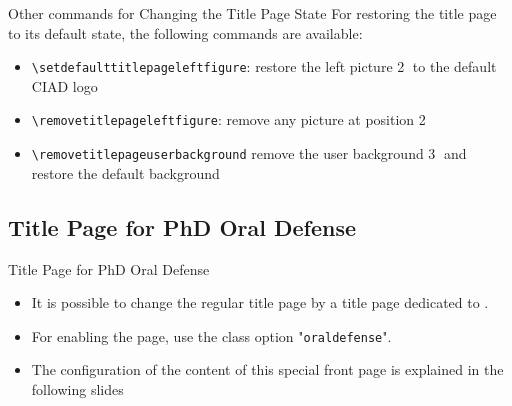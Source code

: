 \documentclass[english,sectioncirclenumberstyle]{ciadbeamer}
\begin{document}
\begin{frame}{{Other commands} for Changing the Title Page State}
	For restoring the title page to its default state, the following commands are available: \\[.25cm]
	\begin{itemize}
		\item \texttt{{\textbackslash}setdefaulttitlepageleftfigure}: restore the left picture \textcircled{2} to the default CIAD logo
		\item \texttt{{\textbackslash}removetitlepageleftfigure}: remove any picture at position \textcircled{2}
		\item \texttt{{\textbackslash}removetitlepageuserbackground} remove the user background \textcircled{3} and restore the default background
	\end{itemize}
\end{frame}

\subsection{Title Page for PhD Oral Defense}

\begin{frame}{{Title Page} for PhD Oral Defense}
	\begin{itemize}
	\item It is possible to change the regular title page by a title page dedicated to .
	\item For enabling the page, use the class option "\texttt{oraldefense}".
	\item The configuration of the content of this special front page is explained in the following slides
	\end{itemize}
	\vfill
	\centering
\end{frame}
\end{document}
